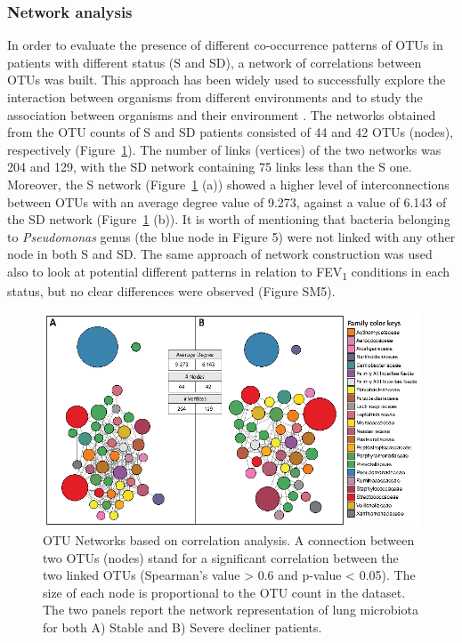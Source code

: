 \subsubsection{Network analysis}
In order to evaluate the presence of different co-occurrence patterns of OTUs in patients with different status (S and SD), a network of correlations between OTUs was built. This approach has been widely used to successfully explore the interaction between organisms from different environments and to study the association between organisms and their environment \cite{barberan2011using, chaffron2010global}. The networks obtained from the OTU counts of S and SD patients consisted of 44 and 42 OTUs (nodes), respectively (Figure~\ref{fig:fig516s}). The number of links (vertices) of the two networks was 204 and 129, with the SD network containing 75 links less than the S one. Moreover, the S network (Figure~\ref{fig:fig516s} (a)) showed a higher level of interconnections between OTUs with an average degree value of 9.273, against a value of 6.143 of the SD network (Figure~\ref{fig:fig516s} (b)). It is worth of mentioning that bacteria belonging to \textit{Pseudomonas }genus (the blue node in Figure 5) were not linked with any other node in both S and SD. The same approach of network construction was used also to look at potential different patterns in relation to FEV\textsubscript{1} conditions in each status, but no clear differences were observed (Figure SM5).\\
\begin{figure}[!tb]
	\centering
	\includegraphics[width=1\textwidth]{./figures/Chapter_7/Figure_5_16s}
  	\caption{\label{fig:fig516s}OTU Networks based on correlation analysis. A connection between two OTUs (nodes) stand for a significant correlation between the two linked OTUs (Spearman's value {\textgreater} 0.6 and p-value {\textless} 0.05). The size of each node is proportional to the OTU count in the dataset. The two panels report the network representation of lung microbiota for both A) Stable and B) Severe decliner patients.}
\end{figure}

